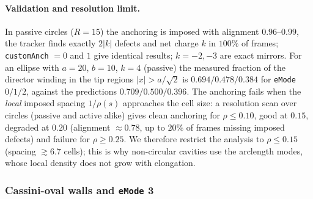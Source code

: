 \paragraph{Validation and resolution limit.} In passive circles ($R=15$) the anchoring is imposed with
alignment $0.96$--$0.99$, the tracker finds exactly $2|k|$ defects and net charge $k$ in $100\%$ of frames;
\texttt{customAnch} $=0$ and $1$ give identical results; $k=-2,-3$ are exact mirrors.
For an ellipse with $a=20$, $b=10$, $k=4$ (passive) the measured fraction of the director winding in
the tip regions $|x|>a/\sqrt2$ is $0.694/0.478/0.384$ for \texttt{eMode} $0/1/2$, against the predictions
$0.709/0.500/0.396$. The anchoring fails when the \emph{local} imposed spacing $1/\rho(s)$ approaches the
cell size: a resolution scan over circles (passive and active alike) gives clean anchoring for
$\rho\le0.10$, good at $0.15$, degraded at $0.20$ (alignment $\approx0.78$, up to $20\%$ of frames
missing imposed defects) and failure for $\rho\ge0.25$. We therefore restrict the analysis to
$\rho\le0.15$ (spacing $\gtrsim6.7$ cells); this is why non-circular cavities use the arclength modes,
whose local density does not grow with elongation.

\subsubsection{Cassini-oval walls and \texttt{eMode} 3}
\label{sec:md-cassini}

